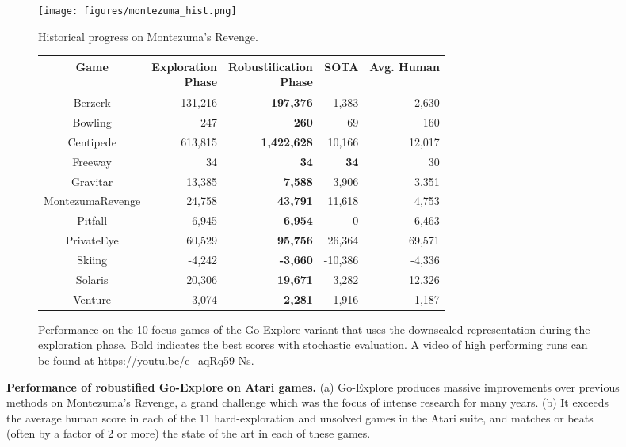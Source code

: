 \documentclass{nature}
\begin{document}
\begin{figure}
    \centering
    \begin{subfigure}[b]{0.95\textwidth}
        \centering
        \texttt{[image: figures/montezuma\_hist.png]}
        \caption{Historical progress on Montezuma's Revenge.}
        \label{fig:montezuma_hist}
        \vspace{5mm}
    \end{subfigure}
    \begin{subfigure}[b]{0.99\textwidth}
        \centering
        \fontsize{9}{10.5}\selectfont
        \begin{tabular}{ c | r | r r r } 
            Game & \shortstack{Exploration \\ Phase} & \shortstack{Robustification \\ Phase} & SOTA & Avg. Human \\
            \hline
            Berzerk & 131,216 & \textbf{197,376} & 1,383 & 2,630 \\
            Bowling & 247  & \textbf{260} & 69 & 160 \\
            Centipede & 613,815 & \textbf{1,422,628} & 10,166 & 12,017 \\
            Freeway & 34 & \textbf{34} & \textbf{34} & 30 \\
            Gravitar & 13,385 & \textbf{7,588} & 3,906 & 3,351 \\
            MontezumaRevenge & 24,758 & \textbf{43,791} & 11,618 & 4,753 \\ 
            Pitfall & 6,945 & \textbf{6,954} & 0 & 6,463 \\
            PrivateEye & 60,529 & \textbf{95,756} & 26,364 & 69,571 \\
            Skiing & -4,242 & \textbf{-3,660} & -10,386 & -4,336 \\
            Solaris & 20,306 & \textbf{19,671} & 3,282 & 12,326 \\
            Venture & 3,074 & \textbf{2,281} & 1,916 & 1,187 \\
            
        \end{tabular}
        \caption{Performance on the 10 focus games of the Go-Explore variant that uses the downscaled representation during the exploration phase. Bold indicates the best scores with stochastic evaluation. A video of high performing runs can be found at \href{https://youtu.be/e_aqRq59-Ns}{https://youtu.be/e\_aqRq59-Ns}.}
        \label{fig:phase2_sota}
    \end{subfigure}
    \caption{\textbf{Performance of robustified Go-Explore on Atari games.} (a) Go-Explore produces massive improvements over previous methods on Montezuma's Revenge, a grand challenge which was the focus of intense research for many years. (b) It exceeds the average human score in each of the 11 hard-exploration and unsolved games in the Atari suite, and matches or beats (often by a factor of 2 or more) the state of the art in each of these games. }
\end{figure}
\end{document}
